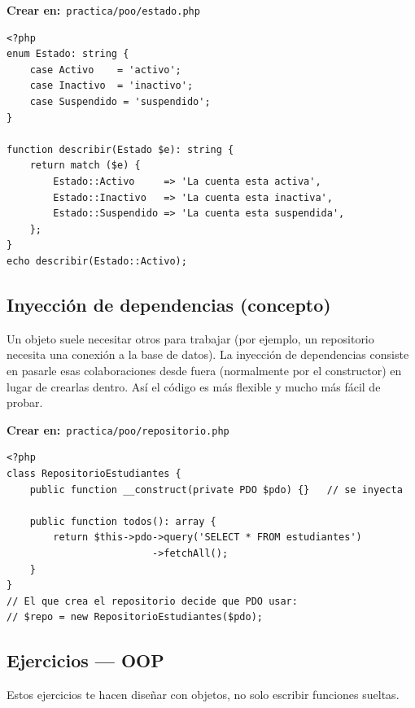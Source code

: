 \documentclass[11pt]{article}
\begin{document}
{\small\color{phpazulo}\textbf{Crear en:}~}\texttt{practica/\allowbreak{}poo/\allowbreak{}estado.\allowbreak{}php}\par\nobreak\vspace{-1pt}
\begin{cajacodigo}
\begin{lstlisting}[style=php]
<?php
enum Estado: string {
    case Activo    = 'activo';
    case Inactivo  = 'inactivo';
    case Suspendido = 'suspendido';
}

function describir(Estado $e): string {
    return match ($e) {
        Estado::Activo     => 'La cuenta esta activa',
        Estado::Inactivo   => 'La cuenta esta inactiva',
        Estado::Suspendido => 'La cuenta esta suspendida',
    };
}
echo describir(Estado::Activo);
\end{lstlisting}
\end{cajacodigo}
\vspace{2pt}
\subsection{Inyección de dependencias (concepto)}
Un objeto suele necesitar otros para trabajar (por ejemplo, un repositorio necesita una conexión a la base de datos). La inyección de dependencias consiste en pasarle esas colaboraciones desde fuera (normalmente por el constructor) en lugar de crearlas dentro. Así el código es más flexible y mucho más fácil de probar.

{\small\color{phpazulo}\textbf{Crear en:}~}\texttt{practica/\allowbreak{}poo/\allowbreak{}repositorio.\allowbreak{}php}\par\nobreak\vspace{-1pt}
\begin{cajacodigo}
\begin{lstlisting}[style=php]
<?php
class RepositorioEstudiantes {
    public function __construct(private PDO $pdo) {}   // se inyecta

    public function todos(): array {
        return $this->pdo->query('SELECT * FROM estudiantes')
                         ->fetchAll();
    }
}
// El que crea el repositorio decide que PDO usar:
// $repo = new RepositorioEstudiantes($pdo);
\end{lstlisting}
\end{cajacodigo}
\vspace{2pt}
\subsection{Ejercicios — OOP}
Estos ejercicios te hacen diseñar con objetos, no solo escribir funciones sueltas.
\end{document}
